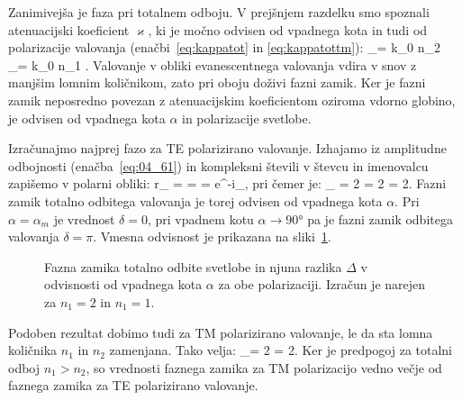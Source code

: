 Zanimivejša je faza pri totalnem odboju. V prejšnjem razdelku smo spoznali atenuacijski koeficient
$\varkappa$, ki je močno odvisen od vpadnega kota in tudi od polarizacije valovanja (enačbi~\ref{eq:kappatot} 
in \ref{eq:kappatottm}):
\beq
\varkappa_{}= k_0 n_2  
\qquad {}\qquad
\varkappa_{}= k_0 n_1 .
\label{eq:04_83}
\eeq
Valovanje v obliki evanescentnega valovanja vdira v snov z manjšim lomnim količnikom, zato
pri oboju doživi fazni zamik. Ker je fazni zamik neposredno povezan z atenuacijskim
koeficientom oziroma vdorno globino, je odvisen od vpadnega kota $\alpha$ in polarizacije svetlobe. 

Izračunajmo najprej fazo za TE polarizirano valovanje. Izhajamo iz amplitudne odbojnosti (enačba~\ref{eq:04_61})
in kompleksni števili v števcu in imenovalcu zapišemo v polarni obliki:
\beq
r_ =  = 
= e^{-i\delta_},
\label{eq:04_84}
\eeq
pri čemer je:
\beq
\delta_ = 2\arctan{} = 2\arctan{} = 
2\arctan{}.
\label{eq:04_85}
\eeq
Fazni zamik totalno odbitega valovanja je torej odvisen od vpadnega kota $\alpha$. 
Pri $\alpha = \alpha_m$ je vrednost $\delta=0$, pri vpadnem kotu $\alpha \to 90\si{\degree}$ pa je
fazni zamik odbitega valovanja $\delta = \pi$. Vmesna odvisnost je prikazana na sliki~\ref{fig:04_faza}.
\begin{figure}[ht]
\centering
\def\svgwidth{80truemm} 

\caption{Fazna zamika totalno odbite svetlobe in 
njuna razlika $\Delta$ v odvisnosti od vpadnega kota $\alpha$ za obe polarizaciji. Izračun 
je narejen za $n_1 = 2$ in $n_1 = 1$.}
\label{fig:04_faza}
\end{figure}

Podoben rezultat dobimo tudi za TM polarizirano valovanje, le da sta lomna količnika $n_1$ in $n_2$
zamenjana. Tako velja:
\beq
\delta_= 2\arctan{} = 2\arctan{}.
\label{eq:04_86}
\eeq
Ker je predpogoj za totalni odboj $n_1 > n_2$, so vrednosti faznega zamika za 
TM polarizacijo vedno večje od faznega zamika za TE polarizirano
valovanje. 

